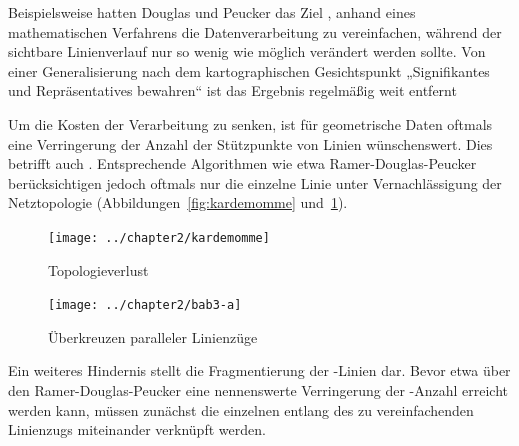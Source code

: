 \documentclass[../main/thesis.tex]{subfiles}
\begin{document}
Beispielsweise hatten Douglas und Peucker das Ziel \noref[Spekulation], anhand eines mathematischen Verfahrens die Datenverarbeitung zu vereinfachen, während der sichtbare Linienverlauf nur so wenig wie möglich verändert werden sollte.
Von einer Generalisierung nach dem kartographischen Gesichtspunkt „Signifikantes und Repräsentatives bewahren“ ist das Ergebnis regelmäßig weit entfernt





Um die Kosten der Verarbeitung zu senken, ist für geometrische Daten oftmals eine Verringerung der Anzahl der Stützpunkte von Linien wünschenswert.
Dies betrifft auch \osm.
Entsprechende Algorithmen wie etwa Ramer-Douglas-Peucker \noref[DP73, zt. n. HS92] berücksichtigen jedoch oftmals nur die einzelne Linie unter Vernachlässigung der Netztopologie (Abbildungen~\ref{fig:kardemomme} und~\ref{fig:crossing-parallels}).

\begin{figure}[ht]
  \begin{minipage}[t]{.5\linewidth}
    \centering
    \texttt{[image: ../chapter2/kardemomme]}
    \caption{Topologieverlust}\label{fig:kardemomme}
  \end{minipage}%
  \begin{minipage}[t]{.5\linewidth}
    \centering
    \texttt{[image: ../chapter2/bab3-a]}
    \caption{Überkreuzen paralleler Linienzüge}\label{fig:crossing-parallels}
  \end{minipage}
\end{figure}

Ein weiteres Hindernis stellt die Fragmentierung der \osm-Linien dar.
Bevor etwa über den Ramer-Douglas-Peucker eine nennenswerte Verringerung der -Anzahl erreicht werden kann, müssen zunächst die einzelnen  entlang des zu vereinfachenden Linienzugs miteinander verknüpft werden.
\end{document}
